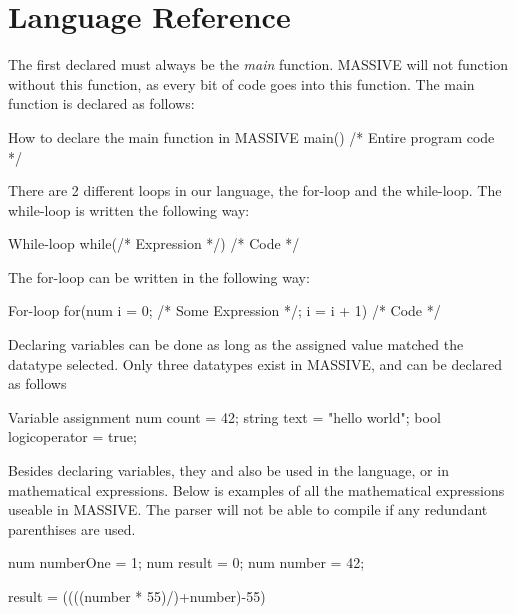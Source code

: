 \section{Language Reference}


The first declared must always be the \textit{main} function. MASSIVE will not function without this function, as every bit of code goes into this function.
The main function is declared as follows:

\begin{source}{How to declare the main function in MASSIVE}{}
main()
{
		/* Entire program code */
}
\end{source}

There are 2 different loops in our language, the for-loop and the while-loop. The while-loop is written the following way:
\begin{source}{While-loop}{}
while(/* Expression */)
{
		/* Code */
}
\end{source}

The for-loop can be written in the following way:
\begin{source}{For-loop}{}
for(num i = 0; /* Some Expression */; i = i + 1)
{
		/* Code */
}
\end{source}

Declaring variables can be done as long as the assigned value matched the datatype selected. Only three datatypes exist in MASSIVE, and can be declared as follows

\begin{source}{Variable assignment}{}
num count = 42;
string text = "hello world";
bool logicoperator = true;
\end{source}

Besides declaring variables, they and also be used in the language, or in mathematical expressions. Below is examples of all the mathematical expressions useable in MASSIVE. The parser will not be able to compile if any redundant parenthises are used.

\begin{source}{}{}

num numberOne = 1;
num result = 0;
num number = 42;

result = ((((number * 55)/)+number)-55)

\end{source}

